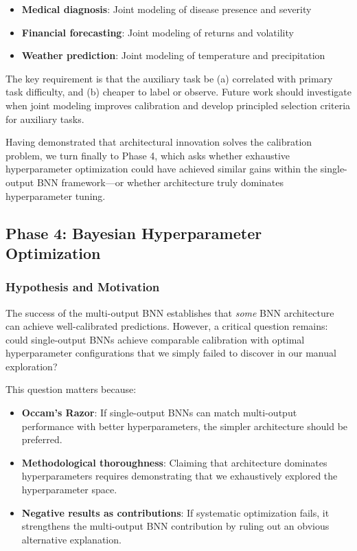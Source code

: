 \begin{itemize}
    \item \textbf{Medical diagnosis}: Joint modeling of disease presence and severity
    \item \textbf{Financial forecasting}: Joint modeling of returns and volatility
    \item \textbf{Weather prediction}: Joint modeling of temperature and precipitation
\end{itemize}

The key requirement is that the auxiliary task be (a) correlated with primary task difficulty, and (b) cheaper to label or observe. Future work should investigate when joint modeling improves calibration and develop principled selection criteria for auxiliary tasks.

Having demonstrated that architectural innovation solves the calibration problem, we turn finally to Phase 4, which asks whether exhaustive hyperparameter optimization could have achieved similar gains within the single-output BNN framework—or whether architecture truly dominates hyperparameter tuning.

\subsection{Phase 4: Bayesian Hyperparameter Optimization}
\label{subsec:phase4_optimization}

\subsubsection{Hypothesis and Motivation}

The success of the multi-output BNN establishes that \textit{some} BNN architecture can achieve well-calibrated predictions. However, a critical question remains: could single-output BNNs achieve comparable calibration with optimal hyperparameter configurations that we simply failed to discover in our manual exploration?

This question matters because:

\begin{itemize}
    \item \textbf{Occam's Razor}: If single-output BNNs can match multi-output performance with better hyperparameters, the simpler architecture should be preferred.
    \item \textbf{Methodological thoroughness}: Claiming that architecture dominates hyperparameters requires demonstrating that we exhaustively explored the hyperparameter space.
    \item \textbf{Negative results as contributions}: If systematic optimization fails, it strengthens the multi-output BNN contribution by ruling out an obvious alternative explanation.
\end{itemize}

